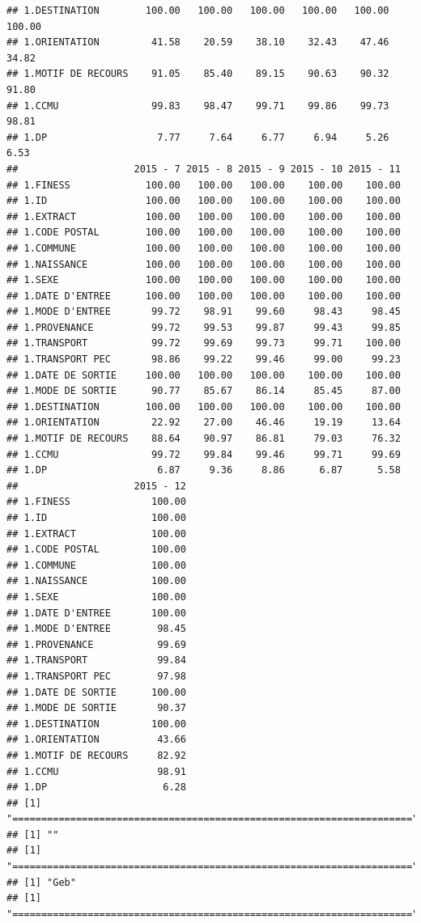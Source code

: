 \documentclass[]{article}
\begin{document}
\begin{verbatim}
## 1.DESTINATION        100.00   100.00   100.00   100.00   100.00   100.00
## 1.ORIENTATION         41.58    20.59    38.10    32.43    47.46    34.82
## 1.MOTIF DE RECOURS    91.05    85.40    89.15    90.63    90.32    91.80
## 1.CCMU                99.83    98.47    99.71    99.86    99.73    98.81
## 1.DP                   7.77     7.64     6.77     6.94     5.26     6.53
##                    2015 - 7 2015 - 8 2015 - 9 2015 - 10 2015 - 11
## 1.FINESS             100.00   100.00   100.00    100.00    100.00
## 1.ID                 100.00   100.00   100.00    100.00    100.00
## 1.EXTRACT            100.00   100.00   100.00    100.00    100.00
## 1.CODE POSTAL        100.00   100.00   100.00    100.00    100.00
## 1.COMMUNE            100.00   100.00   100.00    100.00    100.00
## 1.NAISSANCE          100.00   100.00   100.00    100.00    100.00
## 1.SEXE               100.00   100.00   100.00    100.00    100.00
## 1.DATE D'ENTREE      100.00   100.00   100.00    100.00    100.00
## 1.MODE D'ENTREE       99.72    98.91    99.60     98.43     98.45
## 1.PROVENANCE          99.72    99.53    99.87     99.43     99.85
## 1.TRANSPORT           99.72    99.69    99.73     99.71    100.00
## 1.TRANSPORT PEC       98.86    99.22    99.46     99.00     99.23
## 1.DATE DE SORTIE     100.00   100.00   100.00    100.00    100.00
## 1.MODE DE SORTIE      90.77    85.67    86.14     85.45     87.00
## 1.DESTINATION        100.00   100.00   100.00    100.00    100.00
## 1.ORIENTATION         22.92    27.00    46.46     19.19     13.64
## 1.MOTIF DE RECOURS    88.64    90.97    86.81     79.03     76.32
## 1.CCMU                99.72    99.84    99.46     99.71     99.69
## 1.DP                   6.87     9.36     8.86      6.87      5.58
##                    2015 - 12
## 1.FINESS              100.00
## 1.ID                  100.00
## 1.EXTRACT             100.00
## 1.CODE POSTAL         100.00
## 1.COMMUNE             100.00
## 1.NAISSANCE           100.00
## 1.SEXE                100.00
## 1.DATE D'ENTREE       100.00
## 1.MODE D'ENTREE        98.45
## 1.PROVENANCE           99.69
## 1.TRANSPORT            99.84
## 1.TRANSPORT PEC        97.98
## 1.DATE DE SORTIE      100.00
## 1.MODE DE SORTIE       90.37
## 1.DESTINATION         100.00
## 1.ORIENTATION          43.66
## 1.MOTIF DE RECOURS     82.92
## 1.CCMU                 98.91
## 1.DP                    6.28
## [1] "====================================================================="
## [1] ""
## [1] "====================================================================="
## [1] "Geb"
## [1] "====================================================================="

\end{verbatim}
\end{document}
